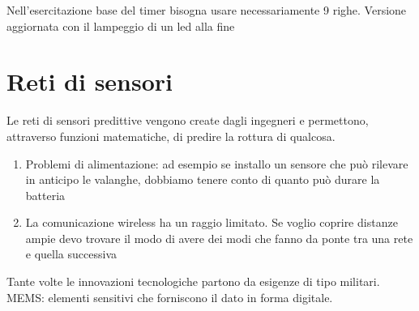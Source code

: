 \documentclass{article}
\begin{document}
    Nell'esercitazione base del timer bisogna usare necessariamente 9 righe.\newline
    Versione aggiornata con il lampeggio di un led alla fine

    \section{Reti di sensori}

    Le reti di sensori predittive vengono create dagli ingegneri e permettono, attraverso funzioni matematiche, di predire la rottura di qualcosa.

    \begin{enumerate}
        \item Problemi di alimentazione: ad esempio se installo un sensore che può rilevare in anticipo le valanghe, dobbiamo tenere conto di quanto può durare la batteria
        \item La comunicazione wireless ha un raggio limitato. Se voglio coprire distanze ampie devo trovare il modo di avere dei modi che fanno da ponte tra una rete e quella successiva
    \end{enumerate}

    Tante volte le innovazioni tecnologiche partono da esigenze di tipo militari.
    MEMS: elementi sensitivi che forniscono il dato in forma digitale.
\end{document}
